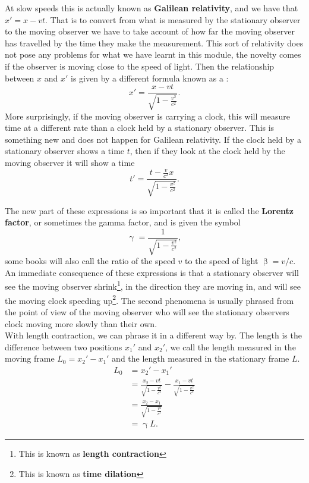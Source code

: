 At slow speeds this is actually known as \textbf{Galilean relativity}, and we have that $x'=x-vt$. That is to convert from what is measured by the stationary observer to the moving observer we have to take account of how far the moving observer has travelled by the time they make the measurement. This sort of relativity does not pose any problems for what we have learnt in this module, the novelty comes if the observer is moving close to the speed of light. Then the relationship between $x$ and $x'$ is given by a different formula known as a :
\begin{equation}
x'=\frac{x-vt}{\sqrt{1-\frac{v^{2}}{c^{2}}}}.
\label{eq: length contraction}
\end{equation}
More surprisingly, if the moving observer is carrying a clock, this will measure time at a different rate than a clock held by a stationary observer. This is something new and does not happen for Galilean relativity. If the clock held by a stationary observer shows a time $t$, then if they look at the clock held by the moving observer it will show a time
\begin{equation}
t'=\frac{t-\frac{v}{c^{2}}x}{\sqrt{1-\frac{v^{2}}{c^{2}}}}.
\label{eq: time dilation}
\end{equation}

The new part of these expressions is so important that it is called the \textbf{Lorentz factor}, or sometimes the gamma factor, and is given the symbol
\begin{equation}
\upgamma=\frac{1}{\sqrt{1-\frac{v^{2}}{c^{2}}}},
\end{equation}
some books will also call the ratio of the speed $v$ to the speed of light $\upbeta=v/c$.\\

An immediate consequence of these expressions is that a stationary observer will see the moving observer shrink\footnote{This is known as \textbf{length contraction}}, in the direction they are moving in, and will see the moving clock speeding up\footnote{This is known as \textbf{time dilation}}. The second phenomena is usually phrased from the point of view of the moving observer who will see the stationary observers clock moving more slowly than their own.\\

With length contraction, we can phrase it in a different way by. The length is the difference between two positions $x_{1}'$ and $x_{2}'$, we call the length measured in the moving frame $L_{0}=x_{2}'-x_{1}'$ and the length measured in the stationary frame $L$.
\begin{align*}
L_{0}&=x_{2}'-x_{1}'\\
	&=\frac{x_{2}-vt}{\sqrt{1-\frac{v^{2}}{c^{2}}}}-\frac{x_{1}-vt}{\sqrt{1-\frac{v^{2}}{c^{2}}}}\\
	&=\frac{x_{2}-x_{1}}{\sqrt{1-\frac{v^{2}}{c^{2}}}}\\
	&=\upgamma L.
\end{align*}

